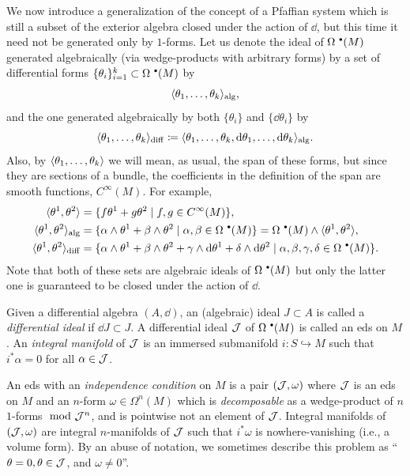 We now introduce a generalization of the concept of a Pfaffian system which is still a subset of the exterior algebra closed under the action of $\dd$, but this time it need not be generated only by $1$-forms. Let us denote the ideal of $\Omega^{\smbullet}(M)$ generated algebraically (via wedge-products with arbitrary forms) by a set of differential forms $\{\theta_i\}_{i=1}^k\subset \Omega^{\smbullet }(M)$ by 
\[\langle\theta_1,\ldots,\theta_k\rangle_{\mathrm{alg}},\]
and the one generated algebraically by both $\{\theta_i\}$ and $\{\dd\theta_i\}$ by 
\[\langle\theta_1,\ldots,\theta_k\rangle_{\mathrm{diff}}\coloneqq \langle\theta_1,\ldots,\theta_k,{\mathrm{d}}\theta_1,\ldots,{\mathrm{d}}\theta_k\rangle_{\mathrm{alg}}.\]
Also, by $\langle\theta_1,\ldots,\theta_k\rangle$ we will mean, as usual, the span of these forms, but since they are sections of a bundle, the coefficients in the definition of the span are smooth functions, $C^\infty(M)$. For example, 
\begin{align}
    \<\theta^1,\theta^2\>&=\{f\theta^1+g\theta^2\mid f,g\in C^\infty(M)\},\\
    \<\theta^1,\theta^2\>_{\mathrm{alg}}&=\{\alpha\wedge\theta^1+\beta\wedge\theta^2\mid \alpha,\beta\in\Omega^{\smbullet }(M)\}=\Omega^{\smbullet}(M)\wedge\<\theta^1,\theta^2\>,\\
    \<\theta^1,\theta^2\>_{\mathrm{diff}}&=\{\alpha\wedge\theta^1+\beta\wedge\theta^2+\gamma\wedge\dd\theta^1+\delta\wedge\dd\theta^2\mid \alpha,\beta,\gamma,\delta\in\Omega^{\smbullet }(M)\}.
\end{align}
Note that both of these sets are algebraic ideals of $\Omega^{\smbullet }(M)$ but only the latter one is guaranteed to be closed under the action of $\dd$. 

\begin{defn}
    Given a differential algebra $(A,\dd)$, an (algebraic) ideal $J\subset A$ is called a \emph{differential ideal} if $\dd J\subset J$.
    A differential ideal $\mathcal{J}$ of $\Omega^{\smbullet }(M)$ is called an \gls{eds} on $M$. An \emph{integral manifold} of $\mathcal{J}$ is an immersed submanifold $i:S\hookrightarrow M$ such that $i^\ast\alpha=0$ for all $\alpha\in \mathcal{J}$. 

    An \gls{eds} with an \emph{independence condition} on $M$ is a pair $(\mathcal{J},\omega)$ where $\mathcal{J}$ is an \gls{eds} on $M$ and an $n$-form $\omega\in\Omega^n (M)$ which is \emph{decomposable} as a wedge-product of $n$ $1$-forms $\ \mathrm{mod}\  \mathcal{J}^n$, and is pointwise not an element of $\mathcal{J}$. Integral manifolds of $(\mathcal{J},\omega)$ are integral $n$-manifolds of $\mathcal{J}$ such that $i^\ast \omega$ is nowhere-vanishing (i.e., a volume form). By an abuse of notation, we sometimes describe this problem as ``$\theta=0,\theta\in \mathcal{J}$, and $\omega\neq 0$''.
\end{defn}

